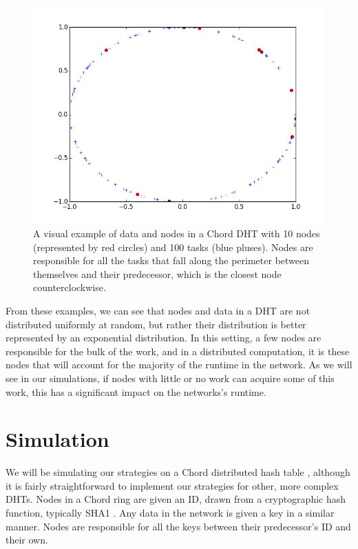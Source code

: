 \begin{figure}
\centering
\includegraphics[width=0.7\linewidth]{figs/exampleChordDistribution}
\caption[Distribution of Nodes and Tasks in a Chiord DHT]{A visual example of data and nodes in a Chord DHT with 10 nodes (represented by red circles) and 100 tasks (blue pluses). Nodes are responsible for all the tasks that fall along the perimeter between themselves and their predecessor, which is the closest node counterclockwise.}
\label{fig:exampleChordDistribution}
\end{figure}

From these examples, we can see that nodes and data in a DHT are not distributed uniformly at random, but rather their distribution is better represented by  an exponential distribution.
In this setting, a few nodes are responsible for the bulk of the work, and in a distributed computation, it is these nodes that will account for the majority of the runtime in the network.
As we will see in our simulations, if nodes with little or no work can acquire some of this work, this has a significant impact on the networks's runtime.


\section{Simulation}
\label{sec:auto-simulation}



We will be simulating our strategies on a Chord distributed hash table \cite{chord}, although it is fairly straightforward to implement our strategies for other, more complex DHTs.
Nodes in a Chord ring are given an ID, drawn from a cryptographic hash function, typically SHA1 \cite{sha1}.
Any data in the network is given a key in a similar manner.
Nodes are responsible for all the keys between their predecessor's ID and their own.

